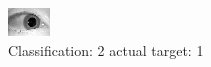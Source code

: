 \begin{figure}[h!]
\begin{center}
\includegraphics[width=0.60\columnwidth]{figures/ID1448_class_2_target_1.png}
\end{center}
\caption{ Classification: 2 actual target: 1}
\label{fig:ID1448_class_2_target_1}
\end{figure}
